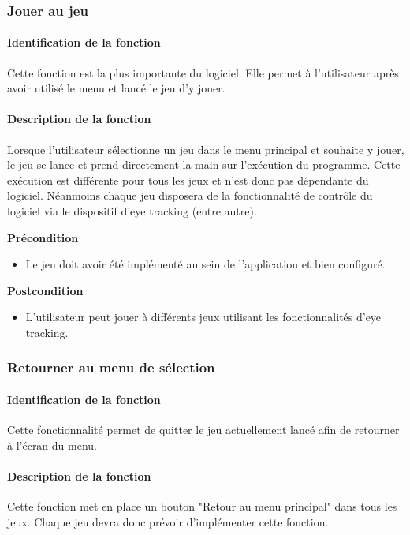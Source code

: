 \documentclass{polytech/polytech}
\begin{document}
\subsubsection{Jouer au jeu}
\paragraph{Identification de la fonction}
Cette fonction est la plus importante du logiciel. Elle permet à l'utilisateur après avoir utilisé le menu et lancé le jeu d'y jouer.
\paragraph{Description de la fonction}
Lorsque l'utilisateur sélectionne un jeu dans le menu principal et souhaite y jouer, le jeu se lance et prend directement la main sur l'exécution du programme. Cette exécution est différente pour tous les jeux et n'est donc pas dépendante du logiciel. Néanmoins chaque jeu disposera de la fonctionnalité de contrôle du logiciel via le dispositif d'eye tracking (entre autre).

\textbf{Précondition}
\begin{itemize}
\item Le jeu doit avoir été implémenté au sein de l'application et bien configuré.
\end{itemize}

\textbf{Postcondition}
\begin{itemize}
\item L'utilisateur peut jouer à différents jeux utilisant les fonctionnalités d'eye tracking.
\end{itemize}

\subsubsection{Retourner au menu de sélection}
\paragraph{Identification de la fonction}
Cette fonctionnalité permet de quitter le jeu actuellement lancé afin de retourner à l'écran du menu. 

\paragraph{Description de la fonction}
Cette fonction met en place un bouton "Retour au menu principal" dans tous les jeux. Chaque jeu devra donc prévoir d'implémenter cette fonction.
\end{document}
